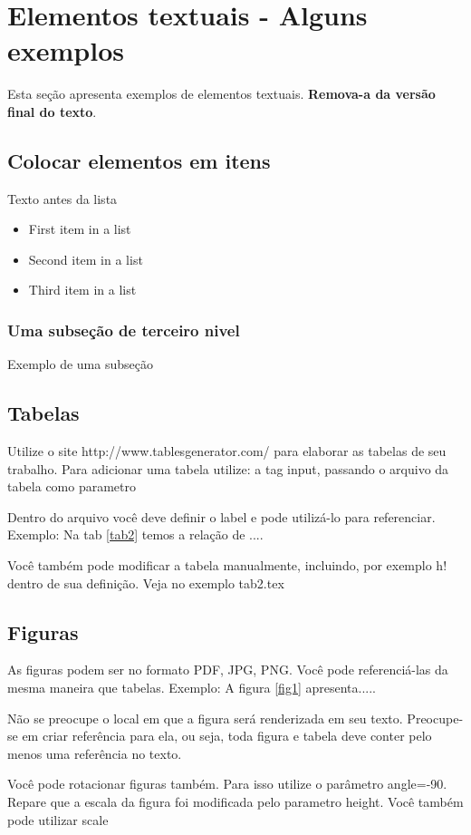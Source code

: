 \documentclass[	DIV=calc,%
							paper=a4,%
							fontsize=12pt,%
							onecolumn]{scrartcl}	 					%
\begin{document}
\section{Elementos textuais - Alguns exemplos}

Esta seção apresenta exemplos de elementos textuais. \textbf{Remova-a da versão final do texto}.


\subsection{Colocar elementos em itens}

Texto antes da lista

\begin{itemize}
	\item First item in a list 
	\item Second item in a list 
	\item Third item in a list
\end{itemize}

\subsubsection{Uma subseção de terceiro nivel}

Exemplo de uma subseção

\subsection{Tabelas}

Utilize o site http://www.tablesgenerator.com/ para elaborar as tabelas de seu trabalho.
Para adicionar uma tabela utilize: a tag input, passando o arquivo da tabela como parametro



Dentro do arquivo você deve definir o label e pode utilizá-lo para referenciar. Exemplo:
Na tab \ref{tab2} temos a relação de ....


Você também pode modificar a tabela manualmente, incluindo, por exemplo h! dentro de sua definição. Veja no exemplo tab2.tex

\subsection{Figuras}

As figuras podem ser no formato PDF, JPG, PNG. Você pode referenciá-las da mesma maneira que tabelas. Exemplo: A figura \ref{fig1} apresenta.....

Não se preocupe o local em que a figura será renderizada em seu texto. Preocupe-se em criar referência para ela, ou seja, toda figura e tabela deve conter pelo menos uma referência no texto.


Você pode rotacionar figuras também. Para isso utilize o parâmetro angle=-90. Repare que a escala da figura foi modificada pelo parametro height. Você também pode utilizar scale



\end{document}
